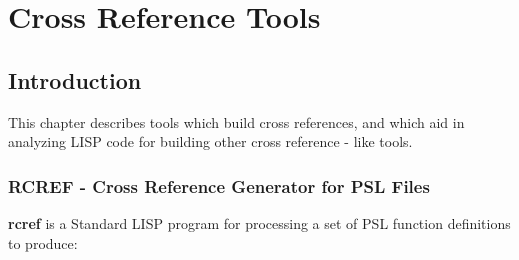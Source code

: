 \chapter{Cross Reference Tools}

\section{Introduction}

  This chapter describes tools which build cross references, and
which aid in  analyzing  LISP  code  for  building  other  cross
reference - like tools.

\subsection{RCREF - Cross Reference Generator for PSL Files}

{\bf rcref} is a Standard LISP program for processing a set of PSL
function definitions to produce:

